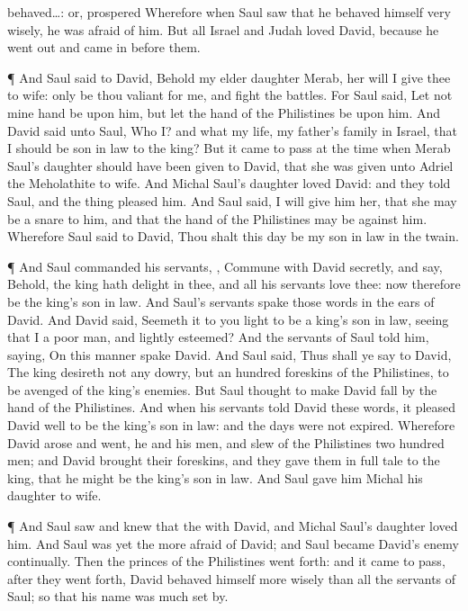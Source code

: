 {{behaved…: or, prospered}
Wherefore when
Saul
saw that he
behaved himself
very
wisely, he was
afraid
of him.
But all
Israel and
Judah
loved
David, because he went
out and came
in
before them.
\par }{\PP {}¶ And
Saul
said to
David, Behold my
elder
daughter
Merab, her will I
give thee to
wife: only be thou
valiant for me, and
fight the
{}
battles. For
Saul
said, Let not mine
hand be upon him, but let the
hand of the
Philistines be upon him.
And
David
said unto
Saul, Who
{} I? and what
{} my
life,
{} my
father’s
family in
Israel, that I should be son in
law to the
king?
But it came to pass at the
time when
Merab
Saul’s
daughter should have been
given to
David, that she was
given unto
Adriel the
Meholathite to
wife.
And
Michal
Saul’s
daughter
loved
David: and they
told
Saul, and the
thing
pleased him.
And
Saul
said, I will
give him her, that she may be a
snare to him, and that the
hand of the
Philistines may be against him. Wherefore
Saul
said to
David, Thou shalt this
day be my son in
law in
{} the
twain.
\par }{\PP {}¶ And
Saul
commanded his
servants,
{},
Commune with
David
secretly, and
say, Behold, the
king hath
delight in thee, and all his
servants
love thee: now therefore be the
king’s son in
law.
And
Saul’s
servants
spake those
words in the
ears of
David. And
David
said,
Seemeth it to you
{}
light
{} to be a
king’s son in
law, seeing that I
{} a
poor
man, and lightly
esteemed?
And the
servants of
Saul
told him,
saying, On this
manner
spake
David.
And
Saul
said, Thus shall ye
say to
David, The
king
desireth not any
dowry, but an
hundred
foreskins of the
Philistines, to be
avenged of the
king’s
enemies. But
Saul
thought to make
David
fall by the
hand of the
Philistines.
And when his
servants
told
David these
words, it
pleased
David well to be the
king’s son in
law: and the
days were not
expired.
Wherefore
David
arose and
went, he and his
men, and
slew of the
Philistines two
hundred
men; and
David
brought their
foreskins, and they gave them in full
tale to the
king, that he might be the
king’s son in
law. And
Saul
gave him
Michal his
daughter to
wife.
\par }{\PP {}¶ And
Saul
saw and
knew that the
{}
{} with
David, and
{}
Michal
Saul’s
daughter
loved him.
And
Saul was yet the
more
afraid
of
David; and
Saul became
David’s
enemy
continually.
Then the
princes of the
Philistines went
forth: and it came to pass,
after they went
forth,
{}
David behaved himself more
wisely than all the
servants of
Saul; so that his
name was
much set
by.

}
